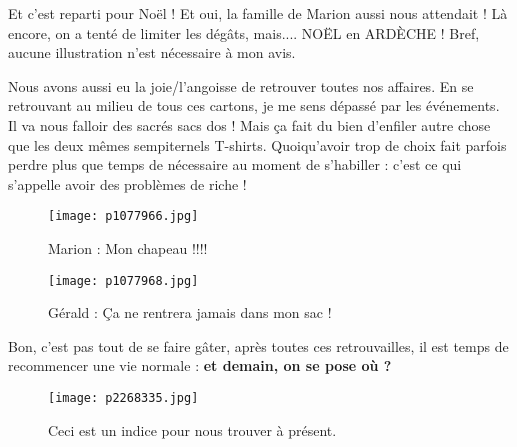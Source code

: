 \documentclass{book}
\begin{document}
Et c'est reparti pour Noël ! Et oui, la famille de Marion aussi nous attendait ! Là encore, on a tenté de limiter les dégâts, mais.... NOËL en ARDÈCHE ! Bref, aucune illustration n'est nécessaire à mon avis.

Nous avons aussi eu la joie/l'angoisse de retrouver toutes nos affaires. En se retrouvant au milieu de tous ces cartons, je me sens dépassé par les événements. Il va nous falloir des sacrés sacs dos ! Mais ça fait du bien d'enfiler autre chose que les deux mêmes sempiternels T-shirts. Quoiqu'avoir trop de choix fait parfois perdre plus que temps de nécessaire au moment de s'habiller : c'est ce qui s'appelle avoir des problèmes de riche !


\begin{figure}[h]
\centering
\texttt{[image: p1077966.jpg]}
\caption*{Marion : Mon chapeau !!!!}
\end{figure}


\begin{figure}[h]
\centering
\texttt{[image: p1077968.jpg]}
\caption*{Gérald : Ça ne rentrera jamais dans mon sac !}
\end{figure}

Bon, c'est pas tout de se faire gâter, après toutes ces retrouvailles, il est temps de recommencer une vie normale : \textbf{et demain, on se pose où ?}


\begin{figure}[h]
\centering
\texttt{[image: p2268335.jpg]}
\caption*{Ceci est un indice pour nous trouver à présent.}
\end{figure}

\tableofcontents
\end{document}
